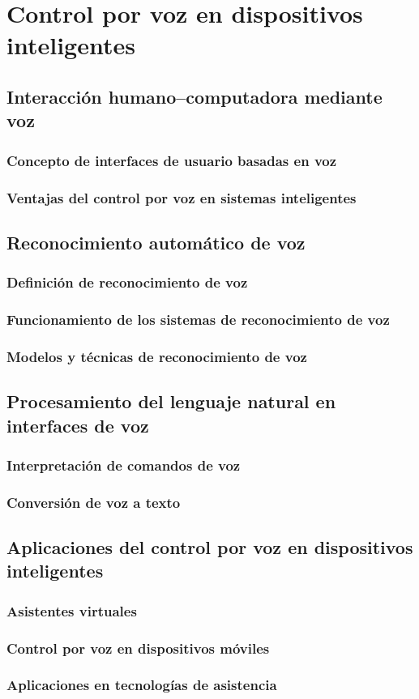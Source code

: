 \chapter{Control por voz en dispositivos inteligentes}

\section{Interacción humano–computadora mediante voz}
\subsection{Concepto de interfaces de usuario basadas en voz}
\subsection{Ventajas del control por voz en sistemas inteligentes}

\section{Reconocimiento automático de voz}
\subsection{Definición de reconocimiento de voz}
\subsection{Funcionamiento de los sistemas de reconocimiento de voz}
\subsection{Modelos y técnicas de reconocimiento de voz}

\section{Procesamiento del lenguaje natural en interfaces de voz}
\subsection{Interpretación de comandos de voz}
\subsection{Conversión de voz a texto}

\section{Aplicaciones del control por voz en dispositivos inteligentes}
\subsection{Asistentes virtuales}
\subsection{Control por voz en dispositivos móviles}
\subsection{Aplicaciones en tecnologías de asistencia}